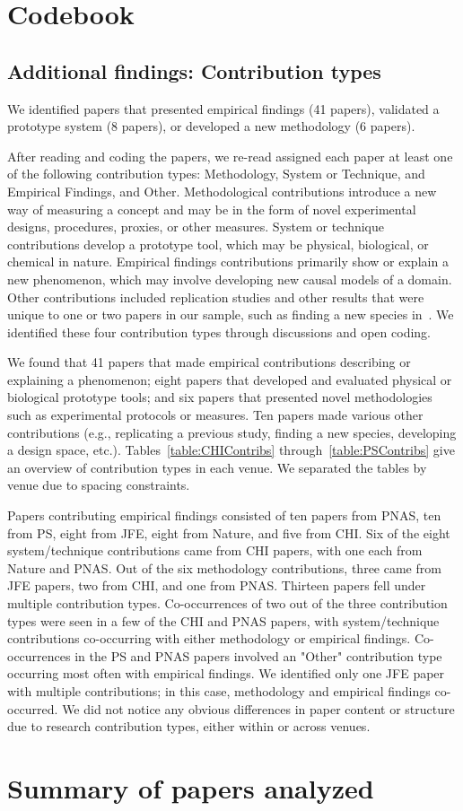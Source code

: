 \section{Codebook}
\tableLitSurveyCodes

\subsection{Additional findings: Contribution types}
We identified papers that presented empirical findings (41 papers), validated a
prototype system (8 papers), or developed a new methodology (6 papers). 

After reading and coding the papers, we re-read assigned each paper at least one
of the following contribution types: Methodology, System or Technique, and
Empirical Findings, and Other. Methodological contributions introduce a new way
of measuring a concept and may be in the form of novel experimental designs,
procedures, proxies, or other measures. System or technique contributions
develop a prototype tool, which may be physical, biological, or chemical in
nature. Empirical findings contributions primarily show or explain a new
phenomenon, which may involve developing new causal models of a domain. Other
contributions included replication studies and other results that were unique to
one or two papers in our sample, such as finding a new species in~\cite{N1}. We
identified these four contribution types through discussions and open coding. 

We found that 41 papers that made empirical contributions describing or
explaining a phenomenon; eight papers that developed and evaluated physical or
biological prototype tools; and six papers that presented novel methodologies
such as experimental protocols or measures. Ten papers made various other
contributions (e.g., replicating a previous study, finding a new species,
developing a design space, etc.). Tables~\ref{table:CHIContribs}
through~\ref{table:PSContribs} give an overview of contribution types in each
venue. We separated the tables by venue due to spacing constraints. 

Papers contributing empirical findings consisted of ten papers from PNAS, ten from
PS, eight from JFE, eight from Nature, and five from CHI. Six of the eight
system/technique contributions came from CHI papers, with one each from Nature and PNAS.
Out of the six methodology contributions, three came from JFE papers, two from
CHI, and one from PNAS. Thirteen papers fell under multiple contribution types.
Co-occurrences of two out of the three contribution types were seen in a few of
the CHI and PNAS papers, with system/technique contributions co-occurring
with either methodology or empirical findings. Co-occurrences in the PS and PNAS
papers involved an "Other" contribution type occurring most often with empirical
findings. We identified only one JFE paper with multiple contributions; in this
case, methodology and empirical findings co-occurred. We did not notice any
obvious differences in paper content or structure due to research contribution
types, either within or across venues.

\section{Summary of papers analyzed}
\tableContributions

% 
% 